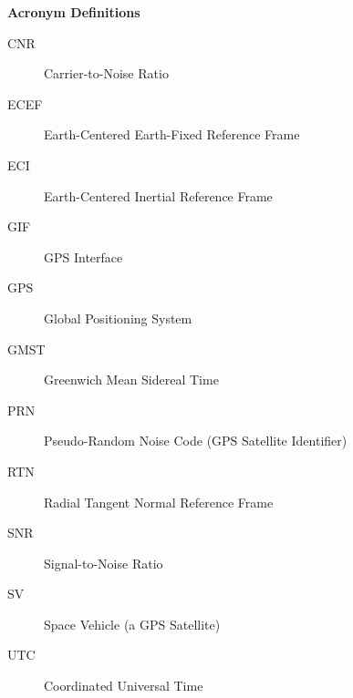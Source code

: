 \documentclass{article}
\begin{document}




\tableofcontents{}
\newpage


{\Large\bfseries Acronym Definitions}\\

\begin{description}
\item[CNR] Carrier-to-Noise Ratio
\item[ECEF] Earth-Centered Earth-Fixed Reference Frame
\item[ECI] Earth-Centered Inertial Reference Frame
\item[GIF] GPS Interface
\item[GPS] Global Positioning System
\item[GMST] Greenwich Mean Sidereal Time
\item[PRN] Pseudo-Random Noise Code (GPS Satellite Identifier)
\item[RTN] Radial Tangent Normal Reference Frame
\item[SNR] Signal-to-Noise Ratio
\item[SV] Space Vehicle (a GPS Satellite)
\item[UTC] Coordinated Universal Time
\end{description}
\newpage
\end{document}
